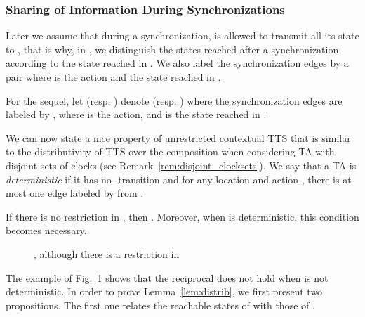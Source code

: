 \documentclass{LMCS}
\theoremstyle{plain}\newtheorem*{prop11}{Proposition~\ref{prop:states} bis}
\begin{document}
\subsubsection*{Sharing of Information During Synchronizations}
Later we assume that during a synchronization,  is allowed to transmit all
its state to , that is why, in , we distinguish the
states reached after a synchronization according to the state reached in
. We also label the synchronization edges by a pair  where  is the action and  the state reached in
. 

For the sequel, let  (resp. )
denote  (resp. ) where the synchronization edges
are labeled by , where  is the action, and  is
the state reached in .

We can now state a nice property of unrestricted contextual TTS that is similar
to the distributivity of TTS over the composition when considering TA with
disjoint sets of clocks (see Remark~\ref{rem:disjoint_clocksets}). We say that a TA
is \emph{deterministic} if it has no -transition and for any location
 and action , there is at most one edge labeled by  from
.

\begin{lem}\label{lem:distrib}
  If there is no restriction in , then
  .
  Moreover, when  is deterministic, this condition becomes necessary.
\end{lem}
\begin{figure}[t]
  \centering
  \def\a{1.75}
\def\b{0.4}
\def\c{4}
  \caption[ is non-deterministic and the reciprocal of
  Lemma~\ref{lem:distrib} does not hold.]
  {,
  although there is a restriction in \label{fig:counterex}}
\end{figure}
The example of Fig.~\ref{fig:counterex} shows that the reciprocal does not hold
when  is not deterministic.
In order to prove Lemma~\ref{lem:distrib}, we first present two propositions.
The first one relates the reachable states of  with those of
.
\end{document}
